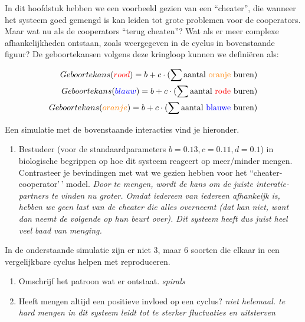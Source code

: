 \documentclass[
  a4paper,
]{scrbook}
\providecommand{\tightlist}{%
  \setlength{\itemsep}{0pt}\setlength{\parskip}{0pt}}\usepackage{longtable,booktabs,array}
\theoremstyle{definition}
\theoremstyle{remark}
\begin{document}
In dit hoofdstuk hebben we een voorbeeld gezien van een ``cheater'', die
wanneer het systeem goed gemengd is kan leiden tot grote problemen voor
de cooperators. Maar wat nu als de cooperators ``terug cheaten''? Wat
als er meer complexe afhankelijkheden ontstaan, zoals weergegeven in de
cyclus in bovenstaande figuur? De geboortekansen volgens deze kringloop
kunnen we definiëren als:

\begin{align}
{Geboortekans(\color{red}rood\color{black})} = b+c\cdot (\sum{\text{aantal \color{orange}oranje \color{black} buren}}) \\
{Geboortekans(\color{blue}blauw\color{black})} = b+c\cdot (\sum{\text{aantal \color{red}rode \color{black} buren}}) \\
{Geboortekans(\color{orange}oranje\color{black})} = b+c\cdot (\sum{\text{aantal \color{blue}blauwe \color{black} buren}})
\end{align}

Een simulatie met de bovenstaande interacties vind je hieronder.

\begin{enumerate}
\def\labelenumi{\alph{enumi}.}
\tightlist
\item
  Bestudeer (voor de standaardparameters \(b=0.13, c=0.11, d=0.1\)) in
  biologische begrippen op hoe dit systeem reageert op meer/minder
  mengen. Contrasteer je bevindingen met wat we gezien hebben voor het
  ``cheater-cooperator'\,' model. \emph{Door te mengen, wordt de kans om
  de juiste interatie-partners te vinden nu groter. Omdat iedereen van
  iedereen afhankeijk is, hebben we geen last van de cheater die alles
  overneemt (dat kan niet, want dan neemt de volgende op hun beurt
  over). Dit systeem heeft dus juist heel veel baad van menging.}
\end{enumerate}

In de onderstaande simulatie zijn er niet 3, maar 6 soorten die elkaar
in een vergelijkbare cyclus helpen met reproduceren.

\begin{enumerate}
\def\labelenumi{\alph{enumi}.}
\setcounter{enumi}{2}
\tightlist
\item
  Omschrijf het patroon wat er ontstaat. \emph{spirals}
\item
  Heeft mengen altijd een positieve invloed op een cyclus? \emph{niet
  helemaal. te hard mengen in dit systeem leidt tot te sterker
  fluctuaties en uitsterven}
\end{enumerate}
\end{document}
